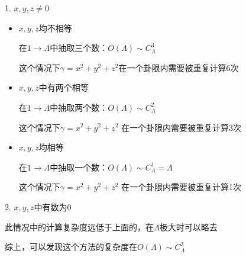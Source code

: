 \documentclass[11pt]{article}
\begin{document}
1.
\(x,y,z\neq 0\) 


\begin{itemize}
\item
 \(x,y,z\)均不相等

{
}
在$1\to\Lambda$中抽取三个数：$O(\Lambda)\sim C_\Lambda ^ { 3 } $

这个情况下$\gamma = x ^ 2 + y ^ 2 + z ^ 2 $在一个卦限内需要被重复计算6次
\item
\(x, y, z\)中有两个相等

{
}
在\(1\to\Lambda\)中抽取两个数：\(O(\Lambda)\sim C_\Lambda ^ { 2 }\)

这个情况下\(\gamma = x ^ 2 + y ^ 2 + z ^ 2\) 在一个卦限内需要被重复计算3次
\item
\(x, y, z\)均相等

{
}
在\(1\to\Lambda\)中抽取一个数：\(O(\Lambda)\sim C_\Lambda ^ {1} =\Lambda\)

这个情况下\(\gamma = x ^ 2 + y ^ 2 + z ^ 2\) 在一个卦限内需要被重复计算1次
\end{itemize}

2. \(x, y, z\)中有数为0

此情况中的计算复杂度远低于上面的，在\(\Lambda\)极大时可以略去


综上，可以发现这个方法的复杂度在\(O(\Lambda)\sim C_\Lambda ^ { 3 }\)

    
    
    
\end{document}
